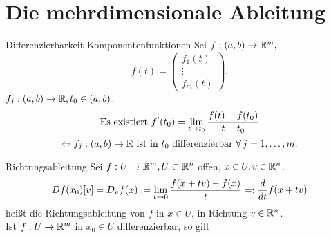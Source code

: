 \documentclass[main.tex]{subfiles}
\begin{document}
\section*{Die mehrdimensionale Ableitung}

\begin{karte}{Differenzierbarkeit Komponentenfunktionen}
    Sei \( f : (a,b) \rightarrow \mathbb{R}^m, \) 
    \[f(t) = \begin{pmatrix}
        f_1(t)\\
        \vdots \\
        f_m(t)
    \end{pmatrix}. \]
    \( f_j : (a,b) \rightarrow \mathbb{R}, t_0 \in (a,b) \).
    \[ \text{Es existiert } f'(t_0) = \lim\limits_{t\rightarrow t_0} \frac{f(t) - f(t_0)}{t - t_0} \]
    \[ \Leftrightarrow \abb{f_j}{(a,b)}{\R} 
    \text{ ist in \(t_0\) differenzierbar } \forall j=1,\ldots,m. \]
\end{karte}

\begin{karte}{Richtungsableitung}
    Sei \( f : U \rightarrow \mathbb{R}^m, U \subset \mathbb{R}^n \) offen, 
    \( x \in U, v \in \mathbb{R}^n \).
    \[ Df (x_0)[v] = 
    D_v f(x) := \lim\limits_{t\rightarrow 0} \frac{f(x + tv) - f(x)}{t} 
    =: \frac{d}{dt} f(x + tv) \]
    heißt die Richtungsableitung von \( f \) in \( x\in U \), 
    in Richtung \( v \in \mathbb{R}^n \).\\
    Ist \( f : U \rightarrow \mathbb{R}^m \) in \( x_0 \in U \)
    differenzierbar, so gilt 
\end{karte}
\end{document}
